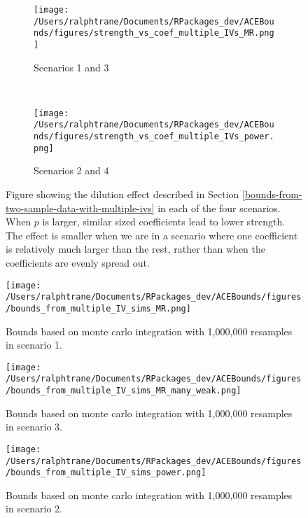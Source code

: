 \documentclass[
]{article}
\theoremstyle{plain}
\begin{document}
\begin{figure*}
  \centering
  \begin{subfigure}{0.5\linewidth}
  \texttt{[image: /Users/ralphtrane/Documents/RPackages\_dev/ACEBounds/figures/strength\_vs\_coef\_multiple\_IVs\_MR.png]}
  \caption{Scenarios 1 and 3}
  \label{fig:strength_vs_coef_multiple_IVs_MR}
  \end{subfigure}%
  ~
  \begin{subfigure}{0.5\linewidth}
  \texttt{[image: /Users/ralphtrane/Documents/RPackages\_dev/ACEBounds/figures/strength\_vs\_coef\_multiple\_IVs\_power.png]}
  \caption{Scenarios 2 and 4}
  \label{fig:strength_vs_coef_multiple_IVs_power}
  \end{subfigure}
  \caption{Figure showing the dilution effect described in Section \ref{bounds-from-two-sample-data-with-multiple-ivs} in each of the four scenarios. When $p$ is larger, similar sized coefficients lead to lower strength. The effect is smaller when we are in a scenario where one coefficient is relatively much larger than the rest, rather than when the coefficients are evenly spread out.}
  \label{fig:strength_vs_coef_multiple_IVs}
\end{figure*}

\clearpage

\begin{sidewaysfigure}
  \centering
  \texttt{[image: /Users/ralphtrane/Documents/RPackages\_dev/ACEBounds/figures/bounds\_from\_multiple\_IV\_sims\_MR.png]}
  \caption{Bounds based on monte carlo integration with 1,000,000 resamples in scenario 1.}
  \label{fig:bounds_from_multiple_IV_sims_MR}
\end{sidewaysfigure}

\clearpage

\begin{sidewaysfigure}
  \centering
  \texttt{[image: /Users/ralphtrane/Documents/RPackages\_dev/ACEBounds/figures/bounds\_from\_multiple\_IV\_sims\_MR\_many\_weak.png]}
  \caption{Bounds based on monte carlo integration with 1,000,000 resamples in scenario 3.}
  \label{fig:bounds_from_multiple_IV_sims_MR_many_weak}
\end{sidewaysfigure}

\clearpage

\begin{sidewaysfigure}
  \centering
  \texttt{[image: /Users/ralphtrane/Documents/RPackages\_dev/ACEBounds/figures/bounds\_from\_multiple\_IV\_sims\_power.png]}
  \caption{Bounds based on monte carlo integration with 1,000,000 resamples in scenario 2.}
  \label{fig:bounds_from_multiple_IV_sims_power}
\end{sidewaysfigure}
\end{document}
